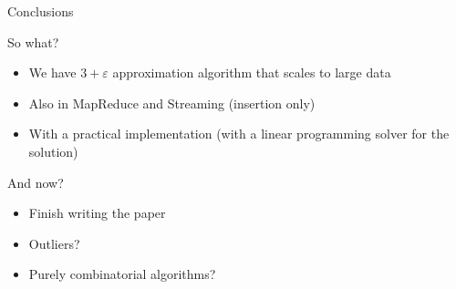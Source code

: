 \documentclass{beamer}
\renewcommand{\epsilon}{\varepsilon}
\begin{document}
\begin{frame}{Conclusions}
	\begin{block}{So what?}
		\begin{itemize}
			\item We have $3+\epsilon$ approximation algorithm that scales to large data
			\item Also in MapReduce and Streaming (insertion only)
			\item With a practical implementation (with a linear programming solver for the solution)
		\end{itemize}
	\end{block}

	\pause

	\begin{block}{And now?}
		\begin{itemize}
			\item Finish writing the paper 
			\item Outliers?
			\item Purely combinatorial algorithms?
		\end{itemize}
	\end{block}
\end{frame}
\end{document}
